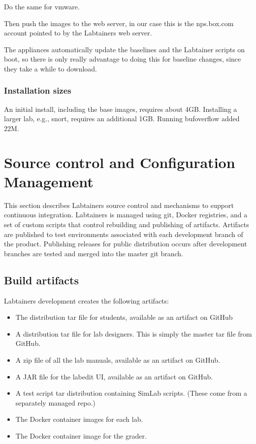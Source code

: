 \documentclass[12pt]{article}
\begin{document}
Do the same for vmware.

Then push the images to the web server, in our case this is the nps.box.com account
pointed to by the Labtainers web server.

The appliances automatically update the baselines and the Labtainer scripts on boot, so there
is only really advantage to doing this for baseline changes, since they take a while to download.

\subsubsection {Installation sizes}
An initial install, including the base images, requires about 4GB.  Installing a larger lab,
e.g., snort, requires an additional 1GB.  Running bufoverflow added 22M.

\section {Source control and Configuration Management}
\label{releases}
This section describes Labtainers source control and mechanisms to support continuous
integration.  Labtainers is managed using git, Docker registries, and a set of custom scripts that control
rebuilding and publishing of artifacts.  Artifacts are published to test environments associated with each
development branch of the product.  Publishing releases for public distribution occurs after development
branches are tested and merged into the master git branch.

\subsection{Build artifacts}
Labtainers development creates the following artifacts:
\begin{itemize}
\item The distribution tar file for students, available as an artifact on GitHub
\item A distribution tar file for lab designers.  This is simply the master tar file from GitHub.
\item A zip file of all the lab manuals, available as an artifact on GitHub.
\item A JAR file for the labedit UI, available as an artifact on GitHub.
\item A test script tar distribution containing SimLab scripts. (These come from a separately managed repo.)
\item The Docker container images for each lab.
\item The Docker container image for the grader.
\end{itemize}
\end{document}
